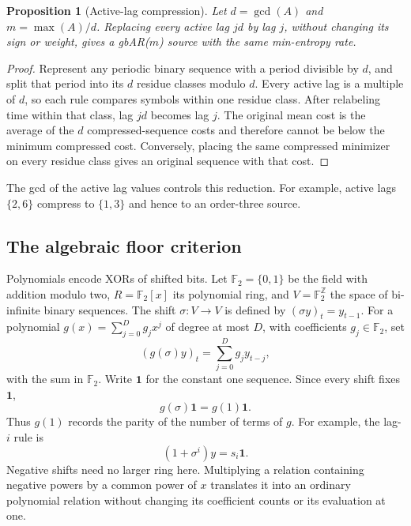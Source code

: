 \documentclass[11pt,a4paper]{article}
\newtheorem{proposition}[theorem]{Proposition}
\begin{document}
\begin{proposition}[Active-lag compression]
\label{prop:active_lag_compression}
Let $d=\gcd(A)$ and $m=\max(A)/d$.  Replacing every active lag $jd$ by
lag $j$, without changing its sign or weight, gives a gbAR($m$) source
with the same min-entropy rate.
\end{proposition}

\begin{proof}
Represent any periodic binary sequence with a period divisible by
$d$, and split that period into its $d$ residue classes modulo $d$.
Every active lag is a multiple of $d$, so each rule compares
symbols within one residue class.  After relabeling time within that
class, lag $jd$ becomes lag $j$.  The original mean cost is the average
of the $d$ compressed-sequence costs and therefore cannot be below the
minimum compressed cost.  Conversely, placing the same compressed
minimizer on every residue class gives an original sequence with that
cost.
\end{proof}

The gcd of the active lag values controls this reduction.  For example, active lags $\{2,6\}$
compress to $\{1,3\}$ and hence to an order-three source.

\subsection{The algebraic floor criterion}
\label{subsec:algebraic_floor}

Polynomials encode XORs of shifted bits.  Let
$\mathbb F_2=\{0,1\}$ be the field with addition modulo two,
$R=\mathbb F_2[x]$ its polynomial ring, and
$V=\mathbb F_2^{\mathbb Z}$ the space of bi-infinite binary sequences.
The shift $\sigma:V\to V$ is defined by $(\sigma y)_t=y_{t-1}$.
For a polynomial $g(x)=\sum_{j=0}^Dg_jx^j$ of degree at most $D$,
with coefficients $g_j\in\mathbb F_2$, set
\[
    (g(\sigma)y)_t=\sum_{j=0}^Dg_jy_{t-j},
\]
with the sum in $\mathbb F_2$.  Write $\mathbf1$ for the constant
one sequence.  Since every shift fixes $\mathbf1$,
\[
    g(\sigma)\mathbf1=g(1)\mathbf1.
\]
Thus $g(1)$ records the parity of the number of terms of $g$.
For example, the lag-$i$ rule is
\begin{equation}
\label{eq:lag_equation}
    (1+\sigma^i)y=s_i\mathbf1.
\end{equation}
Negative shifts need no larger ring here.  Multiplying a relation
containing negative powers by a common power of $x$ translates it
into an ordinary polynomial relation without changing its coefficient
counts or its evaluation at one.
\end{document}
